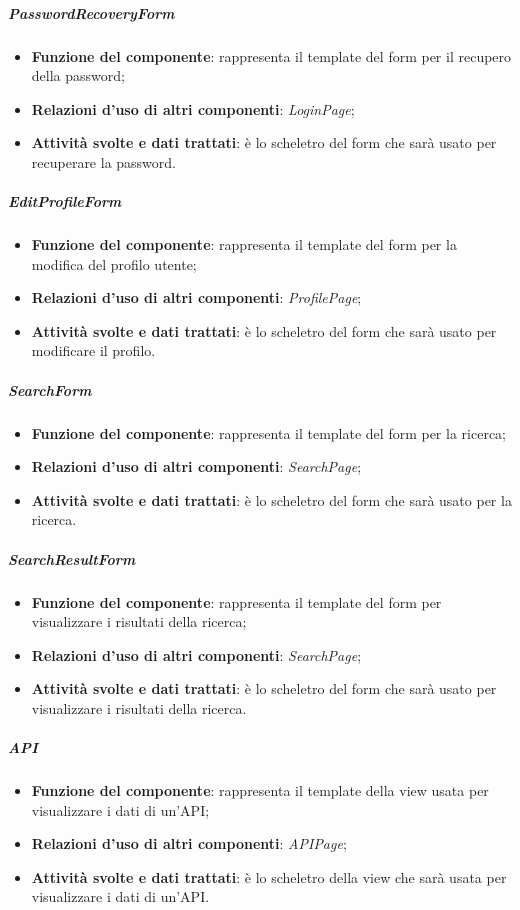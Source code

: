 \subparagraph{PasswordRecoveryForm}
\begin{itemize}
	\item \textbf{Funzione del componente}: rappresenta il template del form per il recupero della password;
	\item \textbf{Relazioni d’uso di altri componenti}: \textit{LoginPage};
	\item \textbf{Attività svolte e dati trattati}: è lo scheletro del form che sarà usato per recuperare la password.
\end{itemize}

\subparagraph{EditProfileForm}
\begin{itemize}
	\item \textbf{Funzione del componente}: rappresenta il template del form per la modifica del profilo utente;
	\item \textbf{Relazioni d’uso di altri componenti}: \textit{ProfilePage};
	\item \textbf{Attività svolte e dati trattati}: è lo scheletro del form che sarà usato per modificare il profilo.
\end{itemize}

\subparagraph{SearchForm}
\begin{itemize}
	\item \textbf{Funzione del componente}: rappresenta il template del form per la ricerca;
	\item \textbf{Relazioni d’uso di altri componenti}: \textit{SearchPage};
	\item \textbf{Attività svolte e dati trattati}: è lo scheletro del form che sarà usato per la ricerca.
\end{itemize}

\subparagraph{SearchResultForm}
\begin{itemize}
	\item \textbf{Funzione del componente}: rappresenta il template del form per visualizzare i risultati della ricerca;
	\item \textbf{Relazioni d’uso di altri componenti}: \textit{SearchPage};
	\item \textbf{Attività svolte e dati trattati}: è lo scheletro del form che sarà usato per visualizzare i risultati della ricerca.
\end{itemize}

\subparagraph{API}
\begin{itemize}
	\item \textbf{Funzione del componente}:  rappresenta il template della view usata per visualizzare i dati di un'API;
	\item \textbf{Relazioni d’uso di altri componenti}: \textit{APIPage};
	\item \textbf{Attività svolte e dati trattati}: è lo scheletro della view che sarà usata per visualizzare i dati di un'API.
\end{itemize}

